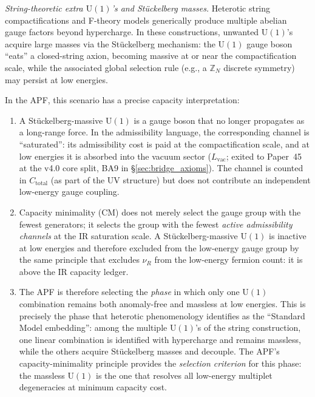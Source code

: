 \documentclass[11pt]{article}
\theoremstyle{definition}
\newcommand{\U}{\mathrm{U}}
\begin{document}
\smallskip\noindent\textit{String-theoretic extra $\U(1)$'s and
St\"uckelberg masses.}\quad
Heterotic string compactifications and F-theory models generically
produce multiple abelian gauge factors beyond hypercharge.  In these
constructions, unwanted $\U(1)$'s acquire large masses via the
St\"uckelberg mechanism: the $\U(1)$ gauge boson ``eats'' a closed-string
axion, becoming massive at or near the compactification scale, while
the associated global selection rule (e.g., a $\mathbb{Z}_N$ discrete
symmetry) may persist at low energies.

In the APF, this scenario has a precise capacity interpretation:
\begin{enumerate}[label=(\alph*),nosep]
  \item A St\"uckelberg-massive $\U(1)$ is a gauge boson that no longer
  propagates as a long-range force.  In the admissibility language, the
  corresponding channel is ``saturated'': its admissibility cost is paid
  at the compactification scale, and at low energies it is absorbed into
  the vacuum sector ($L_{\mathrm{vac}}$; exited to Paper~45 at the v4.0 core split, BA9 in \S\ref{sec:bridge_axioms}).
  The channel is counted in $C_{\mathrm{total}}$ (as part of the UV
  structure) but does not contribute an independent low-energy gauge
  coupling.
  \item Capacity minimality (CM) does not merely select the gauge group
  with the fewest generators; it selects the group with the fewest
  \emph{active admissibility channels} at the IR saturation scale.
  A St\"uckelberg-massive $\U(1)$ is inactive at low energies and
  therefore excluded from the low-energy gauge group by the same
  principle that excludes $\nu_R$ from the low-energy fermion count:
  it is above the IR capacity ledger.
  \item The APF is therefore selecting the \emph{phase} in which only
  one $\U(1)$ combination remains both anomaly-free and massless at
  low energies.  This is precisely the phase that heterotic
  phenomenology identifies as the ``Standard Model embedding'': among
  the multiple $\U(1)$'s of the string construction, one linear
  combination is identified with hypercharge and remains massless, while
  the others acquire St\"uckelberg masses and decouple.  The APF's
  capacity-minimality principle provides the \emph{selection criterion}
  for this phase: the massless $\U(1)$ is the one that resolves all
  low-energy multiplet degeneracies at minimum capacity cost.
\end{enumerate}
\end{document}
